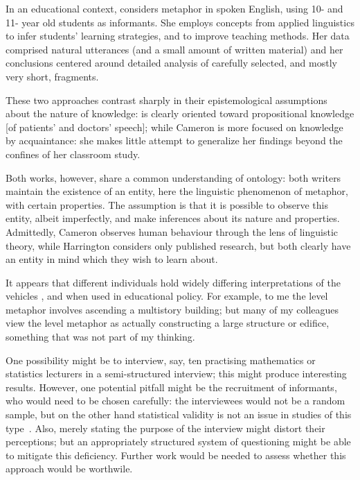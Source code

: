 In an educational context,  considers metaphor in
spoken English, using 10- and 11- year old students as informants.
She employs concepts from applied linguistics to infer students'
learning strategies, and to improve teaching methods.  Her data
comprised natural utterances (and a small amount of written material)
and her conclusions centered around detailed analysis of carefully
selected, and mostly very short, fragments.

These two approaches contrast sharply in their epistemological
assumptions about the nature of knowledge: \citeauthor{harrington2012}
is clearly oriented toward propositional knowledge [of patients' and
  doctors' speech]; while Cameron is more focused on knowledge by
acquaintance: she makes little attempt to generalize her findings
beyond the confines of her classroom study.

Both works, however, share a common understanding of ontology: both
writers maintain the existence of an entity, here the linguistic
phenomenon of metaphor, with certain properties.  The assumption is
that it is possible to observe this entity, albeit imperfectly, and
make inferences about its nature and properties.  Admittedly, Cameron
observes human behaviour through the lens of linguistic theory, while
Harrington considers only published research, but both clearly have an
entity in mind which they wish to learn about.

It appears that different individuals hold widely differing
interpretations of the vehicles , 
and  when used in educational policy.  For example,
to me the level metaphor involves ascending a multistory building; but
many of my colleagues view the level metaphor as actually constructing
a large structure or edifice, something that was not part of my
thinking.

One possibility might be to interview, say, ten practising mathematics
or statistics lecturers in a semi-structured interview; this might
produce interesting results.  However, one potential pitfall might be
the recruitment of informants, who would need to be chosen carefully:
the interviewees would not be a random sample, but on the other hand
statistical validity is not an issue in studies of this
type~\citep{ribbins2012}.  Also, merely stating the purpose of the
interview might distort their perceptions; but an appropriately
structured system of questioning might be able to mitigate this
deficiency.  Further work would be needed to assess whether this approach would be worthwile.

